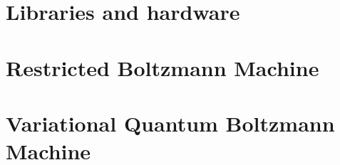 \chapter{Libraries and hardware}


\chapter{Restricted Boltzmann Machine}

\chapter{Variational Quantum Boltzmann Machine}

